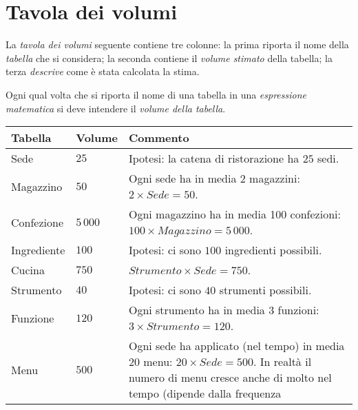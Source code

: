 \section{Tavola dei volumi}\label{sec:volumetable}
La {\it tavola dei volumi} seguente contiene tre colonne: la prima riporta il nome della
{\it tabella} che si considera; la seconda contiene il {\it volume stimato} della tabella; la terza
{\it descrive} come è stata calcolata la stima.

Ogni qual volta che si riporta il nome di una tabella in una {\it espressione matematica} si deve
intendere il {\it volume della tabella}.

{\tabulinesep=3pt
\begin{longtabu} to 
\hline\rowfont\bfseries
Tabella         & Volume        & \centering Commento
\\ \hline \hline \hline \hline \hline %
\endhead
Sede            & \(25\)        & Ipotesi: la catena di ristorazione ha \(25\) sedi.
    \\ \hline %
Magazzino       & \(50\)        & Ogni sede ha in media 2 magazzini: \(2 \times Sede = 50\).
    \\ \hline %
Confezione      & \(5\,000\)    & Ogni magazzino ha in media 100 confezioni: \(100 \times Magazzino = 5\,000\).
    \\ \hline %
Ingrediente     & \(100\)       & Ipotesi: ci sono \(100\) ingredienti possibili.
    \\ \hline %
Cucina          & \(750\)       & \(Strumento \times Sede = 750\).
    \\ \hline %
Strumento       & \(40\)        & Ipotesi: ci sono \(40\) strumenti possibili.
    \\ \hline %
Funzione        & \(120\)       & Ogni strumento ha in media 3 funzioni: \(3 \times Strumento = 120\).
    \\ \hline %
Menu            & \(500\)       & Ogni sede ha applicato (nel tempo) in media 20 menu: \(20 \times Sede = 500\). In
                                   realtà il numero di menu cresce anche di molto nel tempo (dipende dalla frequenza

\end{longtabu}}
